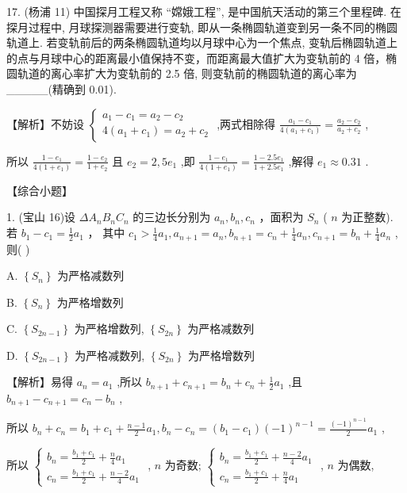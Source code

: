 \documentclass[10pt]{article}
\begin{document}
17. (杨浦 11) 中国探月工程又称 “嫦娥工程”, 是中国航天活动的第三个里程碑. 在探月过程中, 月球探测器需要进行变轨, 即从一条椭圆轨道变到另一条不同的椭圆轨道上. 若变轨前后的两条椭圆轨道均以月球中心为一个焦点, 变轨后椭圆轨道上的点与月球中心的距离最小值保持不变，而距离最大值扩大为变轨前的 4 倍，椭圆轨道的离心率扩大为变轨前的 2.5 倍, 则变轨前的椭圆轨道的离心率为\_\_\_\_\_(精确到 0.01).

【解析】不妨设 \(\left\{  \begin{array}{l} {a}_{1} - {c}_{1} = {a}_{2} - {c}_{2} \\  4\left( {{a}_{1} + {c}_{1}}\right)  = {a}_{2} + {c}_{2} \end{array}\right.\) ,两式相除得 \(\frac{{a}_{1} - {c}_{1}}{4\left( {{a}_{1} + {c}_{1}}\right) } = \frac{{a}_{2} - {c}_{2}}{{a}_{2} + {c}_{2}}\) ,

所以 \(\frac{1 - {e}_{1}}{4\left( {1 + {e}_{1}}\right) } = \frac{1 - {e}_{2}}{1 + {e}_{2}}\) 且 \({e}_{2} = 2,5{e}_{1}\) ,即 \(\frac{1 - {e}_{1}}{4\left( {1 + {e}_{1}}\right) } = \frac{1 - {2.5}{e}_{1}}{1 + {2.5}{e}_{1}}\) ,解得 \({e}_{1} \approx  {0.31}\) .

【综合小题】

1. (宝山 16)设 \(\Delta {A}_{n}{B}_{n}{C}_{n}\) 的三边长分别为 \({a}_{n},{b}_{n},{c}_{n}\) ，面积为 \({S}_{n}\) ( \(n\) 为正整数). 若 \({b}_{1} - {c}_{1} = \frac{1}{2}{a}_{1}\) ， 其中 \({c}_{1} > \frac{1}{4}{a}_{1},{a}_{n + 1} = {a}_{n},{b}_{n + 1} = {c}_{n} + \frac{1}{4}{a}_{n},{c}_{n + 1} = {b}_{n} + \frac{1}{4}{a}_{n}\) ,则(   )

A. \(\left\{  {S}_{n}\right\}\) 为严格减数列

B. \(\left\{  {S}_{n}\right\}\) 为严格增数列

C. \(\left\{  {S}_{{2n} - 1}\right\}\) 为严格增数列, \(\left\{  {S}_{2n}\right\}\) 为严格减数列

D. \(\left\{  {S}_{{2n} - 1}\right\}\) 为严格减数列, \(\left\{  {S}_{2n}\right\}\) 为严格增数列

【解析】易得 \({a}_{n} = {a}_{1}\) ,所以 \({b}_{n + 1} + {c}_{n + 1} = {b}_{n} + {c}_{n} + \frac{1}{2}{a}_{1}\) ,且 \({b}_{n + 1} - {c}_{n + 1} = {c}_{n} - {b}_{n}\) ,

所以 \({b}_{n} + {c}_{n} = {b}_{1} + {c}_{1} + \frac{n - 1}{2}{a}_{1},{b}_{n} - {c}_{n} = \left( {{b}_{1} - {c}_{1}}\right) {\left( -1\right) }^{n - 1} = \frac{{\left( -1\right) }^{n - 1}}{2}{a}_{1}\) ,

所以 \(\left\{  \begin{array}{l} {b}_{n} = \frac{{b}_{1} + {c}_{1}}{2} + \frac{n}{4}{a}_{1} \\  {c}_{n} = \frac{{b}_{1} + {c}_{1}}{2} + \frac{n - 2}{4}{a}_{1} \end{array}\right.\) , \(n\) 为奇数; \(\left\{  \begin{array}{l} {b}_{n} = \frac{{b}_{1} + {c}_{1}}{2} + \frac{n - 2}{4}{a}_{1} \\  {c}_{n} = \frac{{b}_{1} + {c}_{1}}{2} + \frac{n}{4}{a}_{1} \end{array}\right.\) , \(n\) 为偶数,
\end{document}
